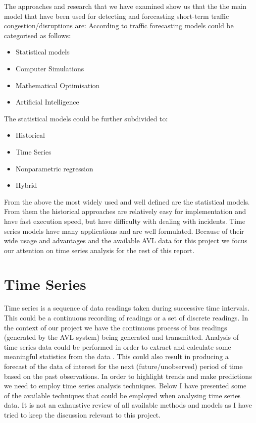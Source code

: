 The approaches and research that we have examined show us that the the main model that have been used for detecting and forecasting short-term traffic congestion/disruptions are:
According to \cite{youKim} traffic forecasting models could be categorised as follows:
\begin{itemize}
	\item Statistical models
	\item Computer Simulations
	\item Mathematical Optimisation
	\item Artificial Intelligence
\end{itemize}
The statistical models could be further subdivided to:
\begin{itemize}
	\item Historical
	\item Time Series
	\item Nonparametric regression
	\item Hybrid
\end{itemize}
From the above the most widely used and well defined are the statistical models. From them the historical approaches are relatively easy for implementation and have fast execution speed, but have difficulty with dealing with incidents. Time series models have many applications and are well formulated. Because of their wide usage and advantages and the available AVL data for this project
we focus our attention on time series analysis for the rest of this report.

\section{Time Series}
Time series is a sequence of data readings taken during successive time intervals. This could be a continuous recording of readings or a set of discrete readings. In the context of our project we have the continuous process of bus readings (generated by the AVL system) being generated and transmitted. Analysis of time series data could be performed in order to extract and calculate some meaningful statistics from the data \cite{shumway2010time}. This could also result in producing a forecast of the data of interest for the next (future/unobserved) period of time based on the past observations. In order to highlight trends and make predictions we need to employ time series analysis techniques. Below I have presented some of the available techniques that could be employed when analysing time series data. It is not an exhaustive review of all available methods and models as I have tried to keep the discussion relevant to this project.

